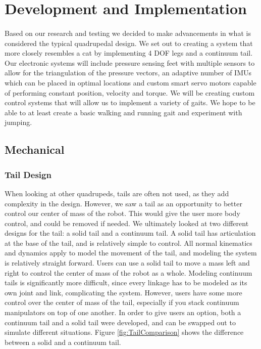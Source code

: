 \section{Development and Implementation}
        \paragraph{} Based on our research and testing we decided to make advancements in what is considered the typical quadrupedal design. We set out to creating a system that more closely resembles a cat by implementing 4 DOF legs and a continuum tail. Our electronic systems will include pressure sensing feet with multiple sensors to allow for the triangulation of the pressure vectors, an adaptive number of IMUs which can be placed in optimal locations and custom smart servo motors capable of performing constant position, velocity and torque. We will be creating custom control systems that will allow us to implement a variety of gaits. We hope to be able to at least create a basic walking and running gait and experiment with jumping.

\subsection{Mechanical}

        \subsubsection{Tail Design}
            When looking at other quadrupeds, tails are often not used, as they add complexity in the design. However, we saw a tail as an opportunity to better control our center of mass of the robot. This would give the user more body control, and could be removed if needed. We ultimately looked at two different designs for the tail: a solid tail and a continuum tail. A solid tail has articulation at the base of the tail, and is relatively simple to control. All normal kinematics and dynamics apply to model the movement of the tail, and modeling the system is relatively straight forward. Users can use a solid tail to move a mass left and right to control the center of mass of the robot as a whole. Modeling continuum tails is significantly more difficult, since every linkage has to be modeled as its own joint and link, complicating the system. However, users have some more control over the center of mass of the tail, especially if you stack continuum manipulators on top of one another. In order to give users an option, both a continuum tail and a solid tail were developed, and can be swapped out to simulate different situations. Figure \ref{fig:TailComparison} shows the difference between a solid and a continuum tail.
            

